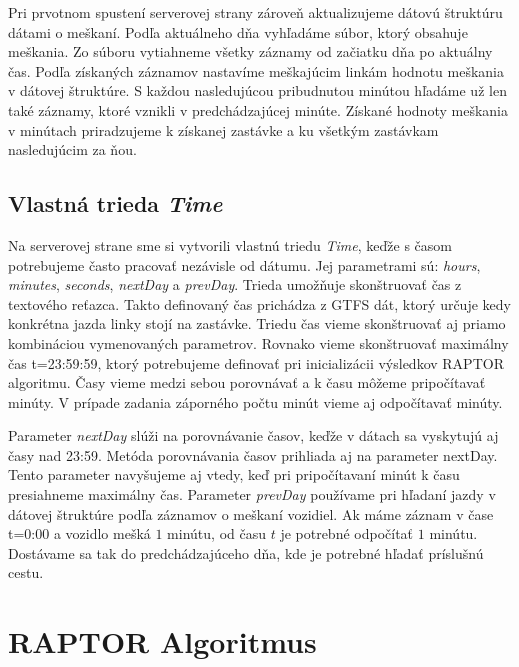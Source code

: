 Pri prvotnom spustení serverovej strany zároveň aktualizujeme dátovú štruktúru dátami o meškaní. Podľa aktuálneho dňa vyhľadáme súbor, ktorý obsahuje meškania. Zo súboru vytiahneme všetky záznamy od začiatku dňa po aktuálny čas. Podľa získaných záznamov nastavíme meškajúcim linkám hodnotu meškania v dátovej štruktúre. S každou nasledujúcou pribudnutou minútou hľadáme už len také záznamy, ktoré vznikli v predchádzajúcej minúte. 
Získané hodnoty meškania v minútach priradzujeme k získanej zastávke a ku všetkým zastávkam nasledujúcim za ňou. 

\subsection{Vlastná trieda \textit{Time}}
Na serverovej strane sme si vytvorili vlastnú triedu \textit{Time}, keďže s časom potrebujeme často pracovať nezávisle od dátumu. Jej parametrami sú: \textit{hours}, \textit{minutes}, \textit{seconds}, \textit{nextDay} a \textit{prevDay}. Trieda umožňuje skonštruovať čas z textového reťazca. Takto definovaný čas prichádza z GTFS dát, ktorý určuje kedy konkrétna jazda linky stojí na zastávke. Triedu čas vieme skonštruovať aj priamo kombináciou vymenovaných parametrov. Rovnako vieme skonštruovať maximálny čas t=23:59:59, ktorý potrebujeme definovať pri inicializácii výsledkov RAPTOR algoritmu. Časy vieme medzi sebou porovnávať a k času môžeme pripočítavať minúty. V prípade zadania záporného počtu minút vieme aj odpočítavať minúty. 

Parameter \textit{nextDay} slúži na porovnávanie časov, keďže v dátach sa vyskytujú aj časy nad 23:59. Metóda porovnávania časov prihliada aj na parameter nextDay. Tento parameter navyšujeme aj vtedy, keď pri pripočítavaní minút k času presiahneme maximálny čas.
Parameter \textit{prevDay} používame pri hľadaní jazdy v dátovej štruktúre podľa záznamov o meškaní vozidiel. Ak  máme záznam v čase t=0:00 a vozidlo mešká $1$ minútu, od času $t$ je potrebné odpočítať $1$ minútu. Dostávame sa tak do predchádzajúceho dňa, kde je potrebné hľadať príslušnú cestu. 

\section{RAPTOR Algoritmus}

